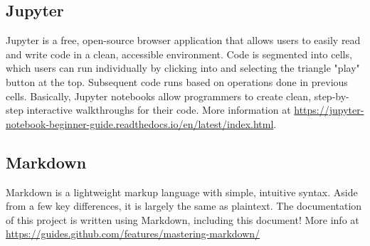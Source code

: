 \subsection{Jupyter}

Jupyter is a free, open-source browser application that allows users to easily read and write code in a clean, accessible environment. Code is segmented into cells, which users can run individually by clicking into and selecting the triangle "play" button at the top. Subsequent code runs based on operations done in previous cells. Basically, Jupyter notebooks allow programmers to create clean, step-by-step interactive walkthroughs for their code. More information at \url{https://jupyter-notebook-beginner-guide.readthedocs.io/en/latest/index.html}.

\subsection{Markdown}

Markdown is a lightweight markup language with simple, intuitive syntax. Aside from a few key differences, it is largely the same as plaintext. The documentation of this project is written using Markdown, including this document! More info at \url{https://guides.github.com/features/mastering-markdown/}
